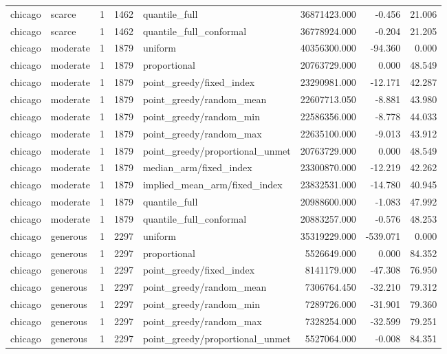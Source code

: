 \begin{tabular}{llrrlrrr}
chicago & scarce & 1 & 1462 & quantile\_full & 36871423.000 & -0.456 & 21.006 \\
chicago & scarce & 1 & 1462 & quantile\_full\_conformal & 36778924.000 & -0.204 & 21.205 \\
chicago & moderate & 1 & 1879 & uniform & 40356300.000 & -94.360 & 0.000 \\
chicago & moderate & 1 & 1879 & proportional & 20763729.000 & 0.000 & 48.549 \\
chicago & moderate & 1 & 1879 & point\_greedy/fixed\_index & 23290981.000 & -12.171 & 42.287 \\
chicago & moderate & 1 & 1879 & point\_greedy/random\_mean & 22607713.050 & -8.881 & 43.980 \\
chicago & moderate & 1 & 1879 & point\_greedy/random\_min & 22586356.000 & -8.778 & 44.033 \\
chicago & moderate & 1 & 1879 & point\_greedy/random\_max & 22635100.000 & -9.013 & 43.912 \\
chicago & moderate & 1 & 1879 & point\_greedy/proportional\_unmet & 20763729.000 & 0.000 & 48.549 \\
chicago & moderate & 1 & 1879 & median\_arm/fixed\_index & 23300870.000 & -12.219 & 42.262 \\
chicago & moderate & 1 & 1879 & implied\_mean\_arm/fixed\_index & 23832531.000 & -14.780 & 40.945 \\
chicago & moderate & 1 & 1879 & quantile\_full & 20988600.000 & -1.083 & 47.992 \\
chicago & moderate & 1 & 1879 & quantile\_full\_conformal & 20883257.000 & -0.576 & 48.253 \\
chicago & generous & 1 & 2297 & uniform & 35319229.000 & -539.071 & 0.000 \\
chicago & generous & 1 & 2297 & proportional & 5526649.000 & 0.000 & 84.352 \\
chicago & generous & 1 & 2297 & point\_greedy/fixed\_index & 8141179.000 & -47.308 & 76.950 \\
chicago & generous & 1 & 2297 & point\_greedy/random\_mean & 7306764.450 & -32.210 & 79.312 \\
chicago & generous & 1 & 2297 & point\_greedy/random\_min & 7289726.000 & -31.901 & 79.360 \\
chicago & generous & 1 & 2297 & point\_greedy/random\_max & 7328254.000 & -32.599 & 79.251 \\
chicago & generous & 1 & 2297 & point\_greedy/proportional\_unmet & 5527064.000 & -0.008 & 84.351 \\

\end{tabular}
